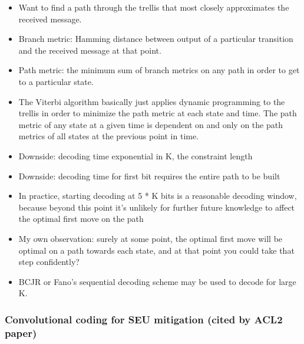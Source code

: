\documentclass{article}
\begin{document}
\begin{itemize}
\item Want to find a path through the trellis that most closely approximates the
received message.

\item Branch metric: Hamming distance between output of a particular transition
and the received message at that point.

\item Path metric: the minimum sum of branch metrics on any path in order to get
to a particular state.

\item The Viterbi algorithm basically just applies dynamic programming to the
trellis in order to minimize the path metric at each state and time. The
path metric of any state at a given time is dependent on and only on the
path metrics of all states at the previous point in time.

\item Downside: decoding time exponential in K, the constraint length

\item Downside: decoding time for first bit requires the entire path to be built

\item In practice, starting decoding at 5 * K bits is a reasonable decoding
window, because beyond this point it's unlikely for further future
knowledge to affect the optimal first move on the path

\item My own observation: surely at some point, the optimal first move will be
optimal on a path towards each state, and at that point you could take
that step confidently?

\item BCJR or Fano's sequential decoding scheme may be used to decode for large
K.
\end{itemize}

\subsubsection{Convolutional coding for SEU mitigation (cited by ACL2 paper)}
\end{document}
